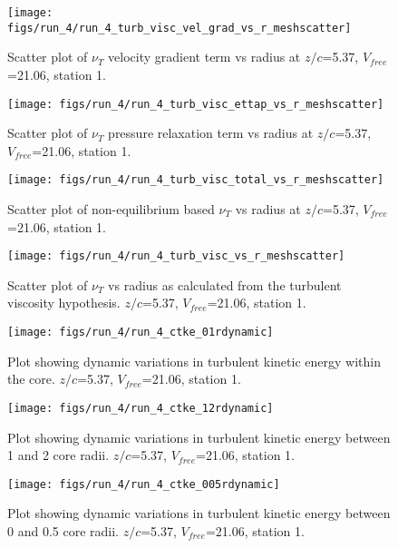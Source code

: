\begin{figure}[H]
\centering
\texttt{[image: figs/run\_4/run\_4\_turb\_visc\_vel\_grad\_vs\_r\_meshscatter]}
\caption{Scatter plot of $\nu_T$ velocity gradient term vs radius at $z/c$=5.37, $V_{free}$=21.06, station 1.}
\end{figure}


\begin{figure}[H]
\centering
\texttt{[image: figs/run\_4/run\_4\_turb\_visc\_ettap\_vs\_r\_meshscatter]}
\caption{Scatter plot of $\nu_T$ pressure relaxation term vs radius at $z/c$=5.37, $V_{free}$=21.06, station 1.}
\end{figure}


\begin{figure}[H]
\centering
\texttt{[image: figs/run\_4/run\_4\_turb\_visc\_total\_vs\_r\_meshscatter]}
\caption{Scatter plot of non-equilibrium based $\nu_T$ vs radius at $z/c$=5.37, $V_{free}$=21.06, station 1.}
\end{figure}


\begin{figure}[H]
\centering
\texttt{[image: figs/run\_4/run\_4\_turb\_visc\_vs\_r\_meshscatter]}
\caption{Scatter plot of $\nu_T$ vs radius as calculated from the turbulent viscosity hypothesis. $z/c$=5.37, $V_{free}$=21.06, station 1.}
\end{figure}


\begin{figure}[H]
\centering
\texttt{[image: figs/run\_4/run\_4\_ctke\_01rdynamic]}
\caption{Plot showing dynamic variations in turbulent kinetic energy within the core. $z/c$=5.37, $V_{free}$=21.06, station 1.}
\end{figure}


\begin{figure}[H]
\centering
\texttt{[image: figs/run\_4/run\_4\_ctke\_12rdynamic]}
\caption{Plot showing dynamic variations in turbulent kinetic energy between 1 and 2 core radii. $z/c$=5.37, $V_{free}$=21.06, station 1.}
\end{figure}


\begin{figure}[H]
\centering
\texttt{[image: figs/run\_4/run\_4\_ctke\_005rdynamic]}
\caption{Plot showing dynamic variations in turbulent kinetic energy between 0 and 0.5 core radii. $z/c$=5.37, $V_{free}$=21.06, station 1.}
\end{figure}



